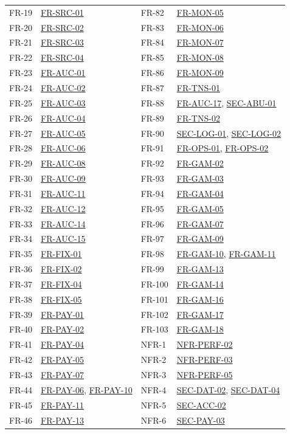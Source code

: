\documentclass[11pt,a4paper]{report}
\newcommand{\rr}[1]{\hyperlink{#1}{#1}}
\begin{document}
{\begin{longtable}{@{}l >{\raggedright\arraybackslash}p{4.6cm} @{\hspace{1.2cm}} l >{\raggedright\arraybackslash}p{4.6cm}@{}}
FR-19 & \rr{FR-SRC-01} & FR-82 & \rr{FR-MON-05} \\
FR-20 & \rr{FR-SRC-02} & FR-83 & \rr{FR-MON-06} \\
FR-21 & \rr{FR-SRC-03} & FR-84 & \rr{FR-MON-07} \\
FR-22 & \rr{FR-SRC-04} & FR-85 & \rr{FR-MON-08} \\
FR-23 & \rr{FR-AUC-01} & FR-86 & \rr{FR-MON-09} \\
FR-24 & \rr{FR-AUC-02} & FR-87 & \rr{FR-TNS-01} \\
FR-25 & \rr{FR-AUC-03} & FR-88 & \rr{FR-AUC-17}, \rr{SEC-ABU-01} \\
FR-26 & \rr{FR-AUC-04} & FR-89 & \rr{FR-TNS-02} \\
FR-27 & \rr{FR-AUC-05} & FR-90 & \rr{SEC-LOG-01}, \rr{SEC-LOG-02} \\
FR-28 & \rr{FR-AUC-06} & FR-91 & \rr{FR-OPS-01}, \rr{FR-OPS-02} \\
FR-29 & \rr{FR-AUC-08} & FR-92 & \rr{FR-GAM-02} \\
FR-30 & \rr{FR-AUC-09} & FR-93 & \rr{FR-GAM-03} \\
FR-31 & \rr{FR-AUC-11} & FR-94 & \rr{FR-GAM-04} \\
FR-32 & \rr{FR-AUC-12} & FR-95 & \rr{FR-GAM-05} \\
FR-33 & \rr{FR-AUC-14} & FR-96 & \rr{FR-GAM-07} \\
FR-34 & \rr{FR-AUC-15} & FR-97 & \rr{FR-GAM-09} \\
FR-35 & \rr{FR-FIX-01} & FR-98 & \rr{FR-GAM-10}, \rr{FR-GAM-11} \\
FR-36 & \rr{FR-FIX-02} & FR-99 & \rr{FR-GAM-13} \\
FR-37 & \rr{FR-FIX-04} & FR-100 & \rr{FR-GAM-14} \\
FR-38 & \rr{FR-FIX-05} & FR-101 & \rr{FR-GAM-16} \\
FR-39 & \rr{FR-PAY-01} & FR-102 & \rr{FR-GAM-17} \\
FR-40 & \rr{FR-PAY-02} & FR-103 & \rr{FR-GAM-18} \\
FR-41 & \rr{FR-PAY-04} & NFR-1 & \rr{NFR-PERF-02} \\
FR-42 & \rr{FR-PAY-05} & NFR-2 & \rr{NFR-PERF-03} \\
FR-43 & \rr{FR-PAY-07} & NFR-3 & \rr{NFR-PERF-05} \\
FR-44 & \rr{FR-PAY-06}, \rr{FR-PAY-10} & NFR-4 & \rr{SEC-DAT-02}, \rr{SEC-DAT-04} \\
FR-45 & \rr{FR-PAY-11} & NFR-5 & \rr{SEC-ACC-02} \\
FR-46 & \rr{FR-PAY-13} & NFR-6 & \rr{SEC-PAY-03} \\

\end{longtable}}
\end{document}
